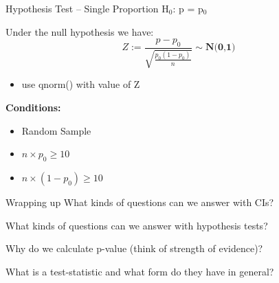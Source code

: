 \documentclass{beamer}
\begin{document}
\begin{frame}{Hypothesis Test -- Single Proportion}
H$_0$: p = p$_0$ \vspace{4mm}

Under the null hypothesis we have:
\begin{equation*}
    Z := \frac{p - p_0}{\sqrt{\frac{p_0(1-p_0)}{n}}} \sim \textbf{N(0,1)}
\end{equation*} \vspace{-4mm}
\begin{itemize}
    \item use qnorm() with value of Z
\end{itemize} \vspace{4mm}

\textbf{Conditions:}
\begin{itemize}
    \item Random Sample
    \item $n \times p_0 \geq 10$
    \item $n \times (1-p_0) \geq 10$
\end{itemize}
\end{frame}

\begin{frame}{Wrapping up}
What kinds of questions can we answer with CIs? \vspace{8mm}

What kinds of questions can we answer with hypothesis tests? \vspace{8mm}

Why do we calculate p-value (think of strength of evidence)? \vspace{8mm}

What is a test-statistic and what form do they have in general?
\end{frame}

%
%
\end{document}
